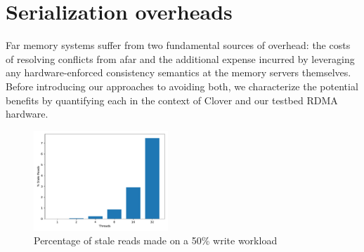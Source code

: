 \section{Serialization overheads}




Far memory systems suffer from two fundamental sources of overhead:
the costs of resolving conflicts from afar and the additional expense
incurred by leveraging any hardware-enforced consistency semantics at
the memory servers themselves.  Before introducing our approaches to
avoiding both, we characterize the potential benefits by quantifying
each in the context of Clover and our testbed RDMA hardware.




\begin{figure}[t]
    \includegraphics[width=0.45\textwidth]{fig/stale_reads.pdf}
    \caption{Percentage of stale reads made on a 50\% write workload }
    \label{fig:stale_reads}
\end{figure}

